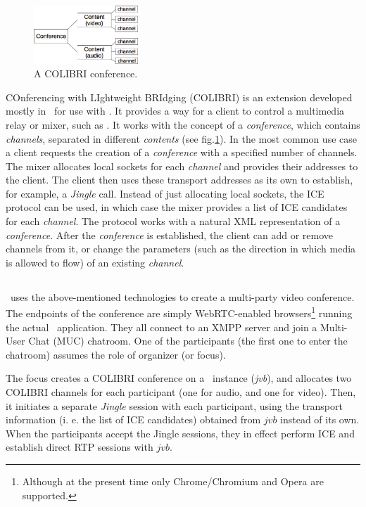 \documentclass[twoside,openright,a4paper,12pt,english]{article}
\begin{document}
\begin{figure}
   \centering
        \includegraphics[width=0.35\textwidth]{./pics/colibri-conf.eps}
        \caption{A COLIBRI conference.}
   \label{colibri-conf}
\end{figure}

COnferencing with LIghtweight BRIdging (COLIBRI\cite{colibri}) is an extension
developed mostly in \bj\ for use with \jvb. It provides a way for a client to control a multimedia
relay or mixer, such as \jvb. It works with the concept of a \emph{conference}, which contains
\emph{channels}, separated in different \emph{contents} (see fig.\ref{colibri-conf}).
In the most common use case a client requests the creation of a \emph{conference} with a specified number of
channels. The mixer allocates local sockets for each \emph{channel} and
provides their addresses to the client. The client then uses these transport
addresses as its own to establish, for example, a \emph{Jingle} call. 
Instead of just allocating local sockets, the ICE protocol can be used, in
which case the mixer provides a list of ICE candidates for each \emph{channel}.
The protocol works with a natural XML representation of a \emph{conference}.
After the \emph{conference} is established, the client can add or remove channels
from it, or change the parameters (such as the direction in which
media is allowed to flow) of an existing \emph{channel}.





\subsection{\jm}
\label{intro-jm}
\jm\ uses the above-mentioned technologies to create a multi-party video conference.
The endpoints of the conference are simply WebRTC-enabled
browsers\footnote{Although at the present time only Chrome/Chromium and Opera are
supported.} running the actual \jm\ application. They all connect to an XMPP
server and join a Multi-User Chat (MUC) chatroom. One of the participants (the
first one to enter the chatroom) assumes the role of organizer (or focus).

The focus creates a COLIBRI conference on a \jvb\ instance (\emph{jvb}), and allocates
two COLIBRI channels for each participant (one for audio, and one for video).
Then, it initiates a separate \emph{Jingle} session with
each participant, using the
transport information (i. e. the list of ICE candidates) obtained from $jvb$
instead of its own. When the participants accept the Jingle sessions, they in
effect perform ICE and establish direct RTP sessions with $jvb$.
\end{document}
